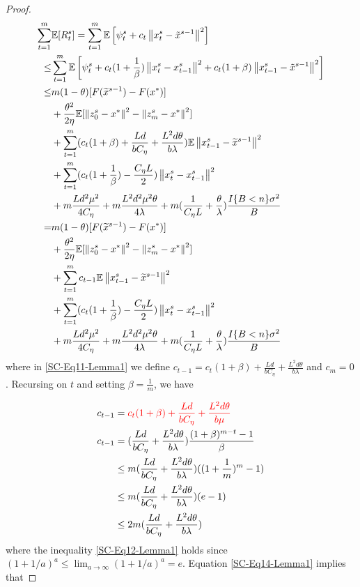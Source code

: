 \documentclass{article}
\newcommand*{\E}{\mathbb{E}}
\newcommand{\norm}[1]{\left\lVert#1\right\rVert}
\theoremstyle{definition}
\theoremstyle{remark}
\begin{document}
{{\begin{proof}
\begin{align}
\sum_{t=1}^{m}& \E[R_{t}^s] = \sum_{t=1}^{m}\E\left[\psi_{t}^s+ c_{t}\norm{x_{t}^s-\tilde{x}^{s-1}}^2\right]\notag\\
\leq& \sum_{t=1}^{m}\E\left[\psi_{t}^s+ c_{t}(1+\frac{1}{\beta})\norm{x_{t}^s-x_{t-1}^s}^2+ c_{t}(1+{\beta})\norm{x_{t-1}^s-\tilde{x}^{s-1}}^2\right]\\
\leq & m(1-\theta)[F(\widetilde{x}^{s-1})-F(x^*)]\notag \\
&+ {\frac{ \theta^2}{2\eta}}\E[\norm{z_{0}^s-x^*}^2-\norm{z_{m}^s-x^*}^2]\notag\\
&+ \sum_{t=1}^{m} (c_{t}(1+{\beta})+\frac{Ld}{bC_{\eta}}+\frac{L^2d\theta}{b\lambda})\E\norm{x_{t-1}^s-\widetilde{x}^{s-1}}^2\notag\\
&+\sum_{t=1}^{m}(c_{t}(1+\frac{1}{\beta})-\frac{C_{\eta} L}{2})\norm{x_{t}^s-x_{t-1}^s}^2\notag\\
&+m\frac{Ld^2\mu^2}{4C_{\eta}}+m\frac{ L^2d^2\mu^2\theta}{4\lambda}+m(\frac{1}{C_{\eta} L}+\frac{\theta}{\lambda})\frac{I\{B < n\} \sigma ^2}{B}\\
= & m(1-\theta)[F(\widetilde{x}^{s-1})-F(x^*)]\notag\\
&+ {\frac{ \theta^2}{2\eta}}\E[\norm{z_{0}^s-x^*}^2-\norm{z_{m}^s-x^*}^2]\notag\\
&+ \sum_{t=1}^{m} c_{t-1}\E\norm{x_{t-1}^s-\widetilde{x}^{s-1}}^2\notag\\
&+\sum_{t=1}^{m}(c_{t}(1+\frac{1}{\beta})-\frac{C_{\eta} L}{2})\norm{x_{t}^s-x_{t-1}^s}^2\notag\\
&+m\frac{Ld^2\mu^2}{4C_{\eta}}+m\frac{ L^2d^2\mu^2\theta}{4\lambda}+m(\frac{1}{C_{\eta} L}+\frac{\theta}{\lambda})\frac{I\{B < n\} \sigma ^2}{B}\label{SC-Eq11-Lemma1}
\end{align}
where in \eqref{SC-Eq11-Lemma1} we define $c_{t-1} = c_{t}(1+{\beta})+\frac{Ld}{bC_{\eta}}+\frac{L^2d\theta}{b\lambda}$ and $c_m=0$. Recursing on $t$ and setting $\beta = \frac{1}{m}$, we have 

\begin{align}
c_{t-1} &= {\color{red} c_{t}(1+{\beta})+\frac{Ld}{bC_{\eta}}+\frac{L^2d\theta}{b\mu} \notag}\\
c_{t-1} &= (\frac{Ld}{bC_{\eta}}+\frac{L^2d\theta}{b\lambda }) \frac{(1+\beta)^{m-t}-1}{\beta} \notag\\
&\leq m(\frac{Ld}{bC_{\eta}}+\frac{L^2d\theta}{b\lambda })((1+\frac{1}{m})^m-1)\label{SC-Eq12-Lemma1}\\
&\leq m(\frac{Ld}{bC_{\eta} }+\frac{L^2d\theta}{b\lambda })(e-1)\notag\\
&\leq 2m(\frac{Ld}{bC_{\eta} }+\frac{L^2d\theta}{b\lambda })\label{SC-Eq14-Lemma1}
\end{align}
where the inequality \eqref{SC-Eq12-Lemma1} holds since $(1+1/a)^a\leq \lim_{a\to\infty}(1+1/a)^a = e$.
Equation \eqref{SC-Eq14-Lemma1} implies that 


\end{proof}}}
\end{document}
